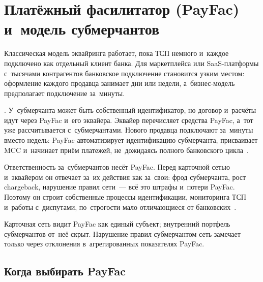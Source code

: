 \section{Платёжный фасилитатор (PayFac) и~модель субмерчантов}\label{sec:ia-payfac}

Классическая модель эквайринга работает, пока ТСП немного и~каждое подключено
как отдельный клиент банка. Для маркетплейса или SaaS-платформы с~тысячами
контрагентов банковское подключение становится узким местом: оформление каждого
продавца занимает дни или недели, а~бизнес-модель предполагает подключение
за~минуты.

. У~субмерчанта может быть собственный идентификатор, но
договор и~расчёты идут через PayFac и~его эквайера. Эквайер перечисляет
средства PayFac, а~тот уже рассчитывается с~субмерчантами. Нового продавца
подключают за~минуты вместо недель: PayFac автоматизирует идентификацию
субмерчанта, присваивает MCC и~начинает приём платежей, не~дожидаясь полного
банковского
цикла~\cite{visa-acceptance-entities,visa-payment-facilitator-marketplace-risk-guide}.

Ответственность за~субмерчантов несёт PayFac. Перед карточной
сетью и~эквайером он отвечает за~их действия как за~свои: фрод
субмерчанта, рост chargeback, нарушение правил сети~--- всё это штрафы
и~потери PayFac. Поэтому он строит собственные процессы идентификации,
мониторинга ТСП и~работы с~диспутами, по~строгости мало отличающиеся от
банковских~\cite{visa-acceptance-entities,visa-payment-facilitator-marketplace-risk-guide}.

Карточная сеть видит PayFac как единый субъект; внутренний портфель
субмерчантов от~неё скрыт. Нарушение правил субмерчантом
сеть замечает только через отклонения в~агрегированных показателях PayFac.


\subsection*{Когда выбирать PayFac}

